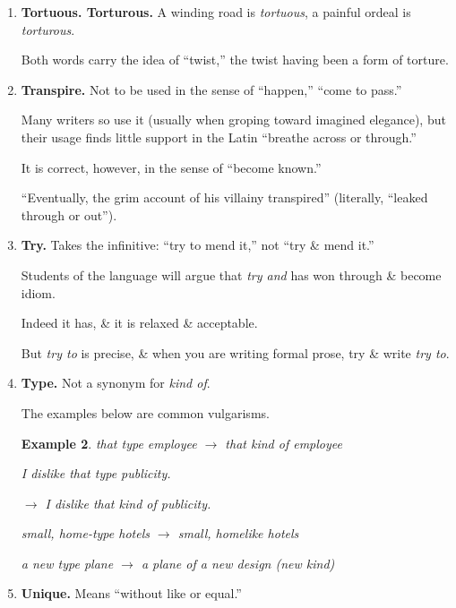 \documentclass{article}
\newtheorem{example}{Example}
\begin{document}
\begin{enumerate}
	Use it sparingly.
	
	Save it for specific application.
	\begin{example}
		Our reorganization plan has a tremendous thrust.
		
		$\to$ The piston has a 5-inch thrust.
		
		The thrust of his letter was that he was working more hours than he'd bargained for.
		
		$\to$ The point he made in his letter was that he was working more hours than he'd bargained for.
	\end{example}
	\item {\bf Tortuous. Torturous.} A winding road is {\it tortuous}, a painful ordeal is {\it torturous}.
	
	Both words carry the idea of ``twist,'' the twist having been a form of torture.
	\item {\bf Transpire.} Not to be used in the sense of ``happen,'' ``come to pass.''
	
	Many writers so use it (usually when groping toward imagined elegance), but their usage finds little support in the Latin ``breathe across or through.''
	
	It is correct, however, in the sense of ``become known.''
	
	``Eventually, the grim account of his villainy transpired'' (literally, ``leaked through or out'').
	\item {\bf Try.} Takes the infinitive: ``try to mend it,'' not ``try \& mend it.''
	
	Students of the language will argue that {\it try and} has won through \& become idiom.
	
	Indeed it has, \& it is relaxed \& acceptable.
	
	But {\it try to} is precise, \& when you are writing formal prose, try \& write {\it try to}.
	\item {\bf Type.} Not a synonym for {\it kind of}.
	
	The examples below are common vulgarisms.
	\begin{example}
		that type employee $\to$ that kind of employee
		
		I dislike that type publicity.
		
		$\to$ I dislike that kind of publicity.
		
		small, home-type hotels $\to$ small, homelike hotels
		
		a new type plane $\to$ a plane of a new design (new kind)
	\end{example}
	\item {\bf Unique.} Means ``without like or equal.''
	

\end{enumerate}
\end{document}
